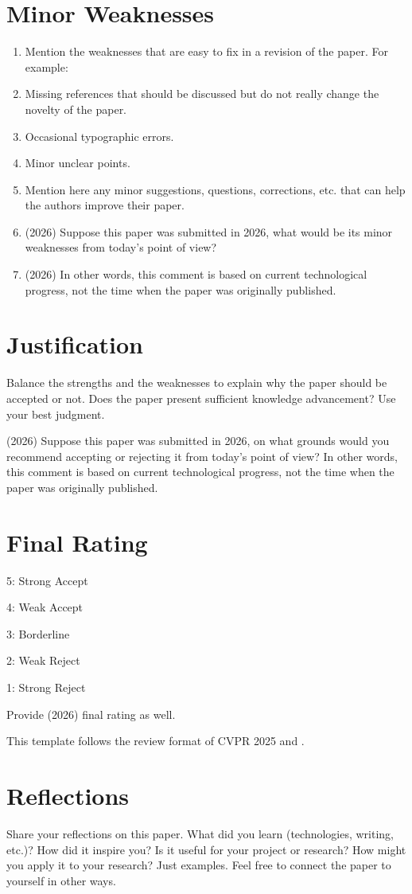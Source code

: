 \documentclass[10pt,twocolumn,letterpaper]{article}
\begin{document}
\section{Minor Weaknesses}
\begin{enumerate}
    \item Mention the weaknesses that are easy to fix in a revision of the paper. For example:
    \item Missing references that should be discussed but do not really change the novelty of the paper.
    \item Occasional typographic errors.
    \item Minor unclear points.
    \item Mention here any minor suggestions, questions, corrections, etc. that can help the authors improve their paper.
    \item (2026) Suppose this paper was submitted in 2026, what would be its minor weaknesses from today’s point of view?
    \item (2026) In other words, this comment is based on current technological progress, not the time when the paper was originally published.
\end{enumerate}

\section{Justification}
Balance the strengths and the weaknesses to explain why the paper should be accepted or not. Does the paper present sufficient knowledge advancement?  Use your best judgment.

(2026) Suppose this paper was submitted in 2026, on what grounds would you recommend accepting or rejecting it from today’s point of view? In other words, this comment is based on current technological progress, not the time when the paper was originally published.

\section{Final Rating}
5: Strong Accept

4: Weak Accept

3: Borderline

2: Weak Reject

1: Strong Reject

Provide (2026) final rating as well.

This template follows the review format of CVPR 2025 \cite{web} and \cite{slides}.

\section{Reflections}
Share your reflections on this paper. What did you learn (technologies, writing, etc.)? How did it inspire you? Is it useful for your project or research? How might you apply it to your research? Just examples. Feel free to connect the paper to yourself in other ways.



{\small


}
\end{document}

